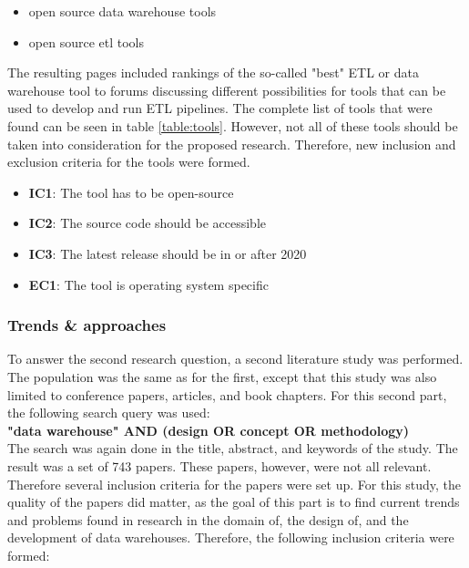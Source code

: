 \documentclass[11pt]{article}
\begin{document}
\begin{itemize}
    \item open source data warehouse tools
    \item open source etl tools
\end{itemize}

The resulting pages included rankings of the so-called "best" ETL or data warehouse tool to forums discussing different possibilities for tools that can be used to develop and run ETL pipelines. The complete list of tools that were found can be seen in table \ref{table:tools}. However, not all of these tools should be taken into consideration for the proposed research. Therefore, new inclusion and exclusion criteria for the tools were formed.

\begin{itemize}
    \item \textbf{IC1}: The tool has to be open-source
    \item \textbf{IC2}: The source code should be accessible
    \item \textbf{IC3}: The latest release should be in or after 2020
    \item \textbf{EC1}: The tool is operating system specific
\end{itemize}

\subsubsection{Trends \& approaches}
\label{searchstrat:trends}
To answer the second research question, a second literature study was performed. The population was the same as for the first, except that this study was also limited to conference papers, articles, and book chapters. For this second part, the following search query was used:\\

\textbf{"data warehouse" AND  (design OR concept OR methodology)}\\

The search was again done in the title, abstract, and keywords of the study. The result was a set of 743 papers. These papers, however, were not all relevant. Therefore several inclusion criteria for the papers were set up. For this study, the quality of the papers did matter, as the goal of this part is to find current trends and problems found in research in the domain of, the design of, and the development of data warehouses. Therefore, the following inclusion criteria were formed:
\end{document}
